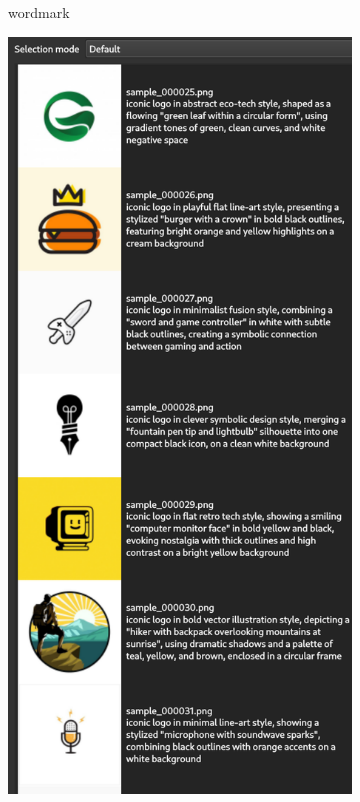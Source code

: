 \documentclass[12pt, %
openright, 
oneside, %
a4paper,    %
brazil]{facom-ufu-abntex2}
\begin{document}
\begin{figure}[H]
\begin{subfigure}{0.2\textwidth}
      \caption{wordmark}
    \end{subfigure}
    \begin{subfigure}{0.2\textwidth}
      \centering
      \includegraphics[width=\linewidth]{iconic.png}

\end{subfigure}
\end{figure}
\end{document}
